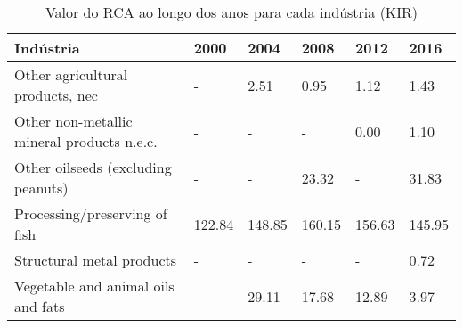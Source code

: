 \begin{table}
\centering
\caption{Valor do RCA ao longo dos anos para cada indústria (KIR)}
\label{tab:ex3-tempo-KIR}
\begin{tabular}{p{6cm}p{1.5cm}p{1.5cm}p{1.5cm}p{1.5cm}p{1.5cm}}
\toprule
                                 Indústria &   2000 &   2004 &   2008 &   2012 &   2016 \\
\midrule
          Other agricultural products, nec &      - &   2.51 &   0.95 &   1.12 &   1.43 \\
Other non-metallic mineral products n.e.c. &      - &      - &      - &   0.00 &   1.10 \\
        Other oilseeds (excluding peanuts) &      - &      - &  23.32 &      - &  31.83 \\
             Processing/preserving of fish & 122.84 & 148.85 & 160.15 & 156.63 & 145.95 \\
                 Structural metal products &      - &      - &      - &      - &   0.72 \\
        Vegetable and animal oils and fats &      - &  29.11 &  17.68 &  12.89 &   3.97 \\
\bottomrule
\end{tabular}
\end{table}
